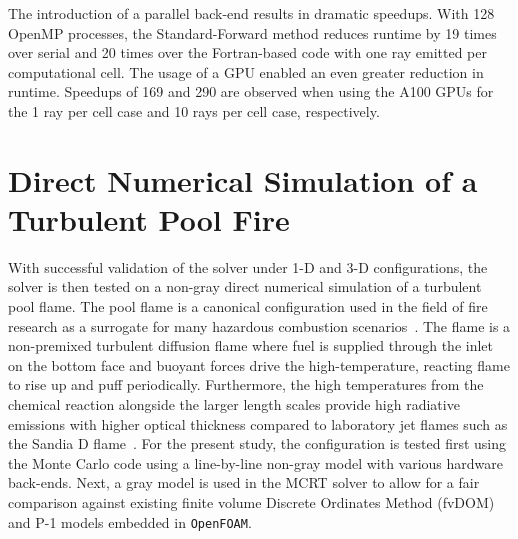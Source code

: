 The introduction of a parallel back-end results in dramatic speedups. With 128 OpenMP processes, the Standard-Forward method reduces runtime by 19 times over serial and 20 times over the Fortran-based code with one ray emitted per computational cell.
The usage of a GPU enabled an even greater reduction in runtime. Speedups of 169 and 290 are observed when using the A100 GPUs for the 1 ray per cell case and 10 rays per cell case, respectively.

\section{Direct Numerical Simulation of a Turbulent Pool Fire}\label{section:DNSPoolFire}
With successful validation of the solver under 1-D and 3-D configurations, the solver is then tested on a non-gray direct numerical simulation of a turbulent pool flame. The pool flame is a canonical configuration used in the field of fire research as a surrogate for many hazardous combustion scenarios~\cite{Chen2023PoolAdvances}. 
The flame is a non-premixed turbulent diffusion flame where fuel is supplied through the inlet on the bottom face and buoyant forces drive the high-temperature, reacting flame to rise up and puff periodically.
Furthermore, the high temperatures from the chemical reaction alongside the larger length scales provide high radiative emissions with higher optical thickness compared to laboratory jet flames such as the Sandia D flame~\cite{Barlow1998EffectsFlames}. For the present study, the configuration is tested first using the Monte Carlo code using a line-by-line non-gray model with various hardware back-ends. 
Next, a gray model is used in the MCRT solver to allow for a fair comparison against existing finite volume Discrete Ordinates Method (fvDOM) and P-1 models embedded in \texttt{OpenFOAM}.

